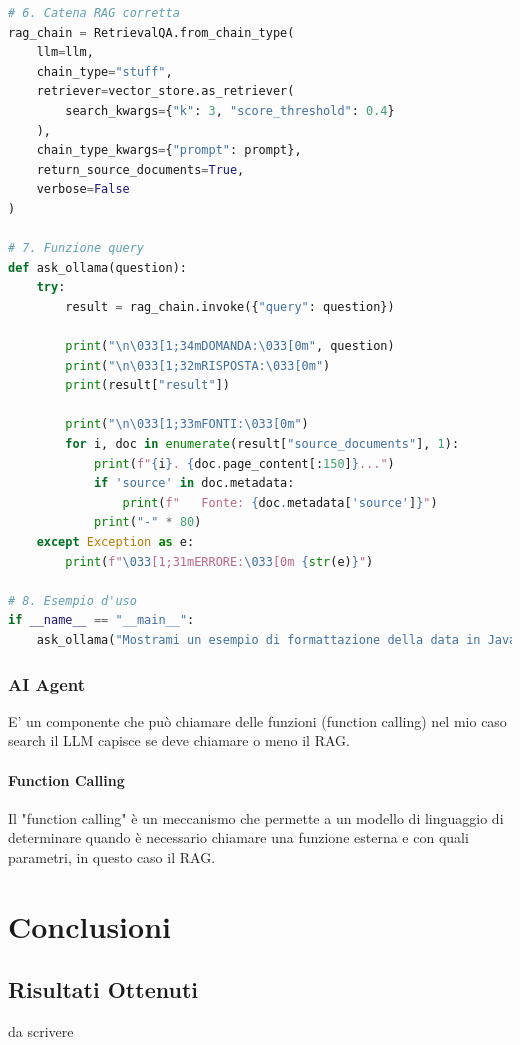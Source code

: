 \documentclass[12pt,a4paper,openright,twoside]{book}
\begin{document}
\begin{lstlisting}[language=Python, caption={Codice Python per la creazione della pipeline RAG}, label={lst:rag}]
# 6. Catena RAG corretta
rag_chain = RetrievalQA.from_chain_type(
    llm=llm,
    chain_type="stuff",
    retriever=vector_store.as_retriever(
        search_kwargs={"k": 3, "score_threshold": 0.4}
    ),
    chain_type_kwargs={"prompt": prompt},
    return_source_documents=True,
    verbose=False
)

# 7. Funzione query
def ask_ollama(question):
    try:
        result = rag_chain.invoke({"query": question})
        
        print("\n\033[1;34mDOMANDA:\033[0m", question)
        print("\n\033[1;32mRISPOSTA:\033[0m")
        print(result["result"])
        
        print("\n\033[1;33mFONTI:\033[0m")
        for i, doc in enumerate(result["source_documents"], 1):
            print(f"{i}. {doc.page_content[:150]}...")
            if 'source' in doc.metadata:
                print(f"   Fonte: {doc.metadata['source']}")
            print("-" * 80)
    except Exception as e:
        print(f"\033[1;31mERRORE:\033[0m {str(e)}")

# 8. Esempio d'uso
if __name__ == "__main__":
    ask_ollama("Mostrami un esempio di formattazione della data in Java usando SimpleDateFormat")
\end{lstlisting}

\subsection{AI Agent}
E' un componente che può chiamare delle funzioni (function calling) nel mio caso search
il LLM capisce se deve chiamare o meno il RAG.
\subsubsection{Function Calling}
Il "function calling" è un meccanismo che permette a un modello di linguaggio di determinare quando è necessario chiamare una funzione esterna e con quali parametri, in questo caso il RAG.


\chapter{Conclusioni}

\section{Risultati Ottenuti}
da scrivere
\end{document}
